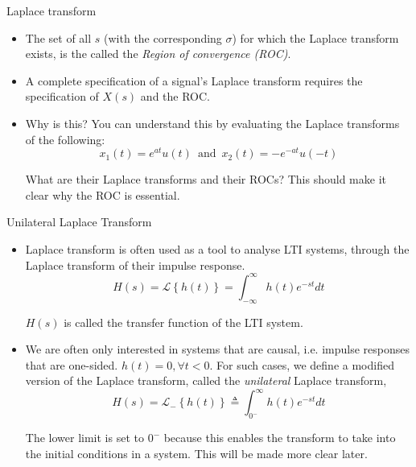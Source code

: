 \documentclass{beamer}
\begin{document}
\begin{frame}{Laplace transform}

\begin{itemize}
\item The set of all $s$ (with the corresponding $\sigma$) for which the Laplace transform exists, is the called the \textit{Region of convergence (ROC)}.
\item A complete specification of a signal's Laplace transform requires the specification of $X(s)$ and the ROC.
\item Why is this? You can understand this by evaluating the Laplace transforms of the following:
\[ x_1(t) = e^{at}u(t) \,\,\, \text{and} \,\,\, x_2(t) = -e^{-at}u(-t) \]

What are their Laplace transforms and their ROCs? This should make it clear why the ROC is essential.
\end{itemize}
\end{frame}

\begin{frame}{Unilateral Laplace Transform}

\begin{itemize}
\item Laplace transform is often used as a tool to analyse LTI systems, through the Laplace transform of their impulse response.
\[ H(s) = \mathcal{L}\left\lbrace h(t) \right\rbrace = \int_{-\infty}^{\infty} h(t) e^{-st}dt \]

$H(s)$ is called the transfer function of the LTI system.

\item We are often only interested in systems that are causal, i.e. impulse responses that are one-sided. $h(t) = 0, \forall t < 0$. For such cases, we define a modified version of the Laplace transform, called the \textit{unilateral} Laplace transform,
\[ H(s) = \mathcal{L}_{-}\left\lbrace h(t) \right\rbrace \triangleq \int_{0^{-}}^{\infty} h(t) e^{-st}dt \]

The lower limit is set to $0^{-}$ because this enables the transform to take into the initial conditions in a system. This will be made more clear later.

\end{itemize}

\end{frame}
\end{document}
